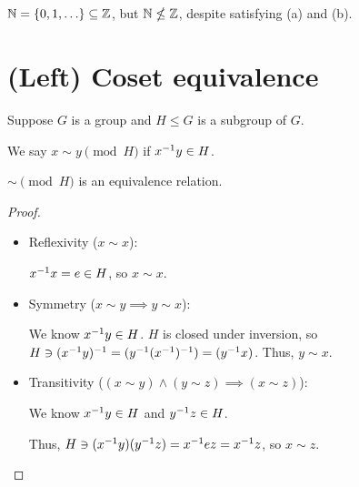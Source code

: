 \documentclass[notes.tex]{subfiles}
\begin{document}
\begin{remark}
	$\mathbb{N} = \{0, 1, \ldots\} \subseteq\mathbb{Z}$, but $\mathbb{N}\nleq\mathbb{Z}$, despite satisfying (a) and (b).
\end{remark}

\chapter{(Left) Coset equivalence} %

Suppose $G$ is a group and $H\le G$ is a subgroup of $G$. 

\begin{definition}
	We say $x\sim y \pmod H$ if ${x}^{-1} y\in H$.
\end{definition}

\begin{proposition}
	$\sim \pmod H$ is an equivalence relation.
\end{proposition}

\begin{proof}\leavevmode
	\begin{itemize}
		\item Reflexivity ($x\sim x$):

		${x}^{-1} x = e\in H$, so $x\sim x$.

		\item Symmetry ($x\sim y \implies y \sim x$):

		We know ${x}^{-1} y \in H$. $H$ is closed under inversion, so $H \ni ({x}^{-1} y)^{-1} = ({y}^{-1} ({x}^{-1})^{-1}) = ({y}^{-1} x)$. Thus, $y \sim x$.

		\item Transitivity ($(x\sim y) \land(y \sim z) \implies (x\sim z)$):

		We know ${x}^{-1} y \in H$ and ${y}^{-1} z \in H$. 
		
		Thus, $H \ni ({x}^{-1} y)({y}^{-1} z) = {x}^{-1} e z = {x}^{-1} z$, so $x\sim z$.
	\end{itemize}
\end{proof}

\end{document}
